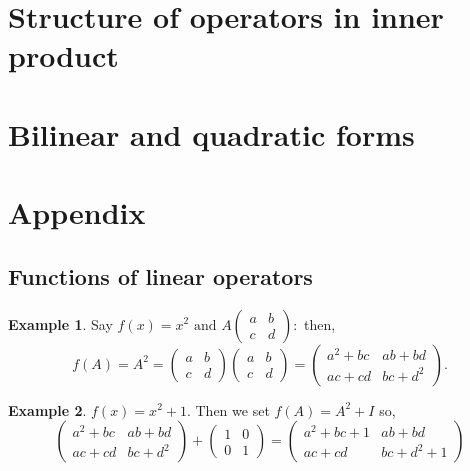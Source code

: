 \documentclass[12pt, a4paper]{article}
\theoremstyle{definition}
\newtheorem*{example}{Example}
\theoremstyle{plain}
\begin{document}
\section{Structure of operators in inner product}

\section{Bilinear and quadratic forms}


























\section{Appendix}

\subsection{Functions of linear operators}

\begin{example}
Say $f(x)=x^2 \text{ and } A \begin{pmatrix} a & b \\ c & d \end{pmatrix}:$ then, $$f(A)=A^2 = \begin{pmatrix} a & b \\ c & d \end{pmatrix}\begin{pmatrix} a & b \\ c & d \end{pmatrix} = \begin{pmatrix} a^2+bc & ab+bd \\ ac+cd & bc+d^2 \end{pmatrix}.$$
\end{example}

\begin{example}
$f(x) = x^2 +1.$ Then we set $f(A)=A^2+I$ so, $$\begin{pmatrix} a^2+bc & ab+bd \\ ac+cd & bc+d^2 \end{pmatrix} + \begin{pmatrix} 1 & 0 \\ 0&1 \end{pmatrix} = \begin{pmatrix} a^2+bc+1 & ab+bd \\ ac+cd & bc+d^2+1 \end{pmatrix}$$
\end{example}
\end{document}
